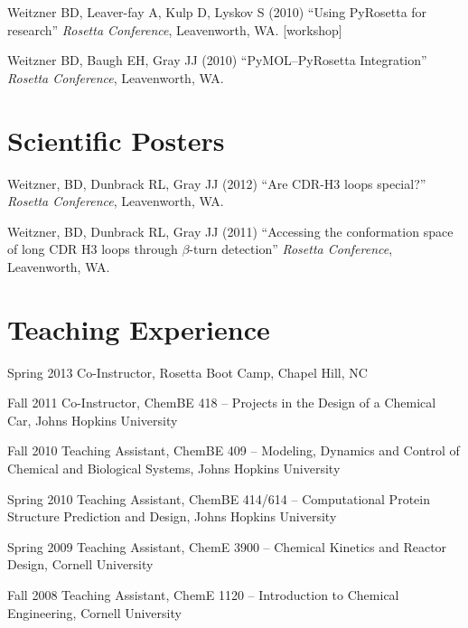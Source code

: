 \documentclass[12pt]{scrartcl}
\begin{document}
\vspace{0.75\baselineskip}

\noindent Weitzner BD, Leaver-fay A, Kulp D,  Lyskov S (2010) ``Using PyRosetta for research'' \textit{Rosetta Conference}, Leavenworth, WA. [workshop]

\vspace{0.75\baselineskip}

\noindent Weitzner BD, Baugh EH, Gray JJ (2010) ``PyMOL--PyRosetta Integration'' \textit{Rosetta Conference}, Leavenworth, WA.

\section{\lsstyle Scientific Posters}
\noindent Weitzner, BD, Dunbrack RL, Gray JJ (2012) ``Are CDR-H3 loops special?'' \textit{Rosetta Conference}, Leavenworth, WA.

\vspace{0.75\baselineskip}

\noindent Weitzner, BD, Dunbrack RL, Gray JJ (2011) ``Accessing the conformation space of long CDR H3 loops through $\beta$-turn detection'' \textit{Rosetta Conference}, Leavenworth, WA.

\section{\lsstyle Teaching Experience}
\begin{CV}
\item[Spring 2013] Co-Instructor, Rosetta Boot Camp, Chapel Hill, NC
\item[Fall 2011] Co-Instructor, ChemBE 418 -- Projects in the Design of a Chemical Car, Johns Hopkins University
\item[Fall 2010] Teaching Assistant, ChemBE 409 -- Modeling, Dynamics and Control of Chemical and Biological Systems, Johns Hopkins University
\item[Spring 2010] Teaching Assistant, ChemBE 414/614 -- Computational Protein Structure Prediction and Design, Johns Hopkins University
\item[Spring 2009] Teaching Assistant, ChemE 3900 -- Chemical Kinetics and Reactor Design, Cornell University
\item[Fall 2008] Teaching Assistant, ChemE 1120 -- Introduction to Chemical Engineering, Cornell University
\end{CV}
\end{document}
